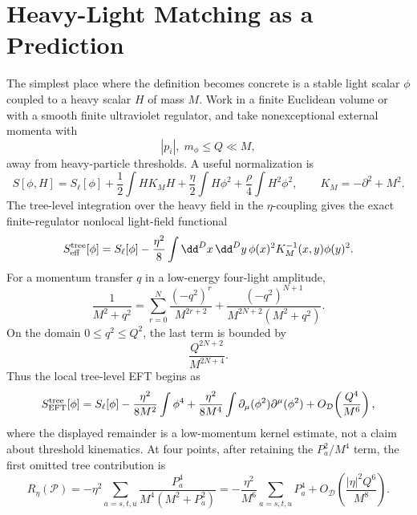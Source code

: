 \section{Heavy-Light Matching as a Prediction}
\label{sec:heavy-light-eft-prediction}

The simplest place where the definition becomes concrete is a stable light
scalar \(\phi\) coupled to a heavy scalar \(H\) of mass \(M\).  Work in a
finite Euclidean volume or with a smooth finite ultraviolet regulator, and
take nonexceptional external momenta with
\[
  |p_i|,\;m_\phi \le Q\ll M,
\]
away from heavy-particle thresholds.  A useful normalization is
\begin{equation}
  S[\phi,H]
  =
  S_\ell[\phi]
  +
  \frac12\int H K_M H
  +
  \frac{\eta}{2}\int H\phi^2
  +
  \frac{\rho}{4}\int H^2\phi^2,
  \qquad
  K_M=-\partial^2+M^2 .
  \label{eq:heavy-light-euclidean-action}
\end{equation}
The tree-level integration over the heavy field in the \(\eta\)-coupling gives
the exact finite-regulator nonlocal light-field functional
\begin{equation}
  S_{\rm eff}^{\rm tree}[\phi]
  =
  S_\ell[\phi]
  -
  \frac{\eta^2}{8}
  \int \dd^Dx\,\dd^Dy\,
  \phi(x)^2 K_M^{-1}(x,y)\phi(y)^2 .
  \label{eq:heavy-light-tree-nonlocal}
\end{equation}
For a momentum transfer \(q\) in a low-energy four-light amplitude,
\begin{equation}
  \frac{1}{M^2+q^2}
  =
  \sum_{r=0}^{N}
  \frac{(-q^2)^r}{M^{2r+2}}
  +
  \frac{(-q^2)^{N+1}}
       {M^{2N+2}(M^2+q^2)} .
  \label{eq:heavy-kernel-local-expansion}
\end{equation}
On the domain \(0\le q^2\le Q^2\), the last term is bounded by
\[
  \frac{Q^{2N+2}}{M^{2N+4}}.
\]
Thus the local tree-level EFT begins as
\begin{equation}
  S_{\rm EFT}^{\rm tree}[\phi]
  =
  S_\ell[\phi]
  -
  \frac{\eta^2}{8M^2}\int\phi^4
  +
  \frac{\eta^2}{8M^4}\int
    \partial_\mu(\phi^2)\partial^\mu(\phi^2)
  +
  O_{\mathcal D}\!\left(\frac{Q^4}{M^6}\right),
  \label{eq:heavy-light-tree-local-action}
\end{equation}
where the displayed remainder is a low-momentum kernel estimate, not a claim
about threshold kinematics.  At four points, after retaining the
\(P_a^2/M^4\) term, the first omitted tree contribution is
\[
  R_\eta(\mathcal P)
  =
  -\eta^2
  \sum_{a=s,t,u}
  \frac{P_a^4}{M^4(M^2+P_a^2)}
  =
  -\frac{\eta^2}{M^6}
  \sum_{a=s,t,u}P_a^4
  +
  O_{\mathcal D}\!\left(\frac{|\eta|^2Q^6}{M^8}\right).
\]

